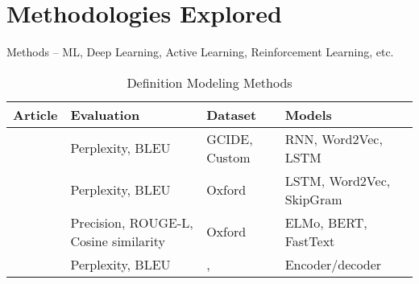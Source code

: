 \section{Methodologies Explored}
Methods -- ML, Deep Learning, Active Learning, Reinforcement Learning, etc.

\begin{longtable}{|p{3.5cm}|p{3.5cm}|p{3.5cm}|p{3.5cm}|}
    \caption{Definition Modeling Methods}                                                                                                                                                                                                                                                                                                                                                  \\
    \hline
    Article                                                                                                                  & Evaluation                                                       & Dataset                                                                                                                                       & Models                                   \\
    \hline
    \citeauthor{noraset_definition_2016} \citeyear{noraset_definition_2016} \cite{noraset_definition_2016}                   & Perplexity, BLEU                                                 & GCIDE, Custom                                                                                                                                 & RNN, Word2Vec, LSTM                      \\
    \hline
    \citeauthor{gadetsky_conditional_2018} \citeyear{gadetsky_conditional_2018} \cite{gadetsky_conditional_2018}             & Perplexity, BLEU                                                 & Oxford                                                                                                                                        & LSTM, Word2Vec, SkipGram                 \\
    \hline
    \citeauthor{chang_what_2019} \citeyear{chang_what_2019} \cite{chang_what_2019}                                           & Precision, ROUGE-L, Cosine similarity                            & Oxford                                                                                                                                        & ELMo, BERT, FastText                     \\
    \hline
    \citeauthor{washio_bridging_2019} \citeyear{washio_bridging_2019} \cite{washio_bridging_2019}                            & Perplexity, BLEU                                                 & \cite{noraset_definition_2016}, \cite{gadetsky_conditional_2018}                                                                              & Encoder/decoder                          \\

\end{longtable}
